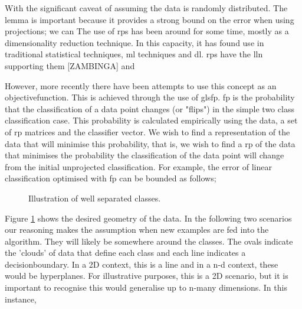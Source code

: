 With the significant caveat of assuming the data is randomly distributed. The lemma is important because it provides a strong bound on the error when using projections; we can  The use of \gls{rp}s has been around for some time, mostly as a dimensionality reduction technique. In this capacity, it has found use in traditional statistical techniques, \gls{ml} techniques and \gls{dl}. \gls{rp}s have the \gls{lln} supporting them [ZAMBINGA] and 

However, more recently there have been attempts to use this concept as an \gls{objectivefunction}. This is achieved through the use of gls{fp}. \gls{fp} is the probability that the classification of a data point changes (or "flips") in the simple two class classification case. This probability is calculated empirically using the data, a set of \gls{rp} matrices and the classifier vector. We wish to find a representation of the data that will minimise this probability, that is, we wish to find a \gls{rp} of the data that minimises the probability the classification of the data point will change from the initial unprojected classification.  For example, the error of linear classification optimised with \gls{fp} can be bounded as follows;

\begin{figure}[H]
\centering
{}
\caption{Illustration of well separated classes.} 
\label{fig:good_sep_classes} %
\end{figure}

Figure \ref{fig:good_sep_classes} shows the desired geometry of the data. In the following two scenarios our reasoning makes the assumption when new examples are fed into the algorithm. They will likely be somewhere around the classes. The ovals indicate the 'clouds' of data that define each class and each line indicates a \gls{decisionboundary}. In a 2D context, this is a line and in a n-d context, these would be \gls{hyperplane}s.  For illustrative purposes, this is a 2D scenario, but it is important to recognise this would generalise up to n-many dimensions.  In this instance, 

